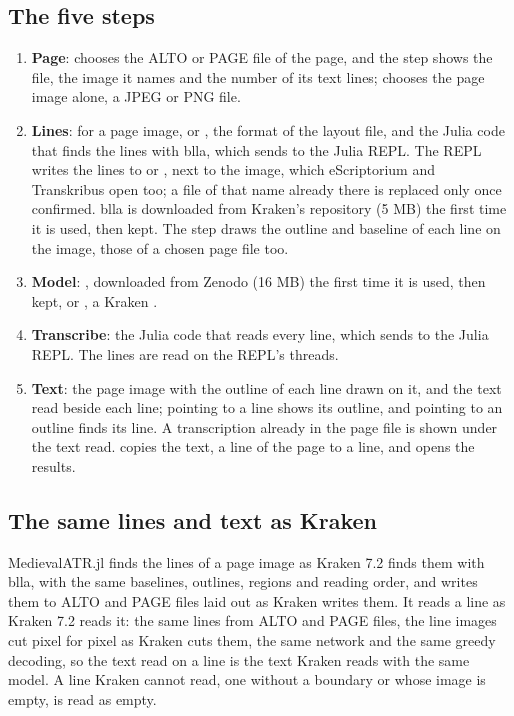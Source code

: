 \subsection{The five steps}
\begin{enumerate}
  \item \textbf{Page}:  chooses the ALTO or PAGE file of the page, and the step shows the
    file, the image it names and the number of its text lines;  chooses the page image
    alone, a JPEG or PNG file.
  \item \textbf{Lines}: for a page image,  or , the format of the layout file, and the Julia code
    that finds the lines with blla, which  sends to the Julia REPL. The REPL writes the lines to
     or , next to the image, which eScriptorium and Transkribus open
    too; a file of that name already there is replaced only once confirmed. blla is downloaded from Kraken's
    repository (5 MB) the first time it is used, then kept. The step draws the outline and baseline of each line on
    the image, those of a chosen page file too.
  \item \textbf{Model}: , downloaded from Zenodo (16 MB) the first time it is used, then
    kept, or , a Kraken .
  \item \textbf{Transcribe}: the Julia code that reads every line, which  sends to the Julia REPL. The
    lines are read on the REPL's threads.
  \item \textbf{Text}: the page image with the outline of each line drawn on it, and the text read beside each line;
    pointing to a line shows its outline, and pointing to an outline finds its line. A transcription already in the
    page file is shown under the text read.  copies the text, a line of the page to a line, and
     opens the results.
\end{enumerate}

\subsection{The same lines and text as Kraken}
MedievalATR.jl finds the lines of a page image as Kraken 7.2 finds them with blla, with the same baselines, outlines,
regions and reading order, and writes them to ALTO and PAGE files laid out as Kraken writes them. It reads a line as
Kraken 7.2 reads it: the same lines from ALTO and PAGE files, the line images cut
pixel for pixel as Kraken cuts them, the same network and the same greedy decoding, so the text read on a line is the
text Kraken reads with the same model. A line Kraken cannot read, one without a boundary or whose image is empty, is
read as empty.

